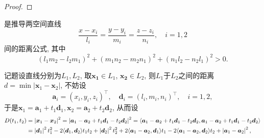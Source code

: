 \begin{quiza}
\begin{proof}
\end{proof}
\woe 是推导两空间直线\[\frac{x-x_i}{l_i}=\frac{y-y_i}{m_i}=\frac{z-z_i}{n_i},\quad i=1,2\]间的距离公式, 其中\[(l_1m_2-l_2m_1)^2+(m_1n_2-m_2n_1)^2+(n_1l_2-n_2l_1)^2>0.\]
\begin{solution}
记题设直线分别为\(L_1,L_2\), 取\(\boldsymbol{x_1}\in L_1\), \(\boldsymbol{x_2}\in L_2\), 则\(L_1\)于\(L_2\)之间的距离\(d = \min\left|\boldsymbol{x}_1-\boldsymbol{x}_2\right|\), 不妨设\[\boldsymbol{a}_i=\left(x_i,y_i,z_i\right)^\top,\quad \boldsymbol{d}_i=\left(l_i,m_i,n_i\right)^\top,\quad i=1,2,\]于是\(\boldsymbol{x}_1=\boldsymbol{a}_1+t_1\boldsymbol{d}_1,\boldsymbol{x}_2=\boldsymbol{a}_2+t_2\boldsymbol{d}_2\), 从而设\[\begin{split}
D(t_1,t_2)&=\left|\boldsymbol{x}_1-\boldsymbol{x}_2\right|^2=\left|\boldsymbol{a}_1-\boldsymbol{a}_2+t_1\boldsymbol{d}_1-t_2\boldsymbol{d}_2\right|^2=\inp{\boldsymbol{a}_1-\boldsymbol{a}_2+t_1\boldsymbol{d}_1-t_2\boldsymbol{d}_2,\boldsymbol{a}_1-\boldsymbol{a}_2+t_1\boldsymbol{d}_1-t_2\boldsymbol{d}_2}\\&=\left|\boldsymbol{d}_1\right|^2t_1^2-2\inp{\boldsymbol{d}_1,\boldsymbol{d}_2}t_1t_2+\left|\boldsymbol{d}_2\right|^2t_2^2+2\inp{\boldsymbol{a}_1-\boldsymbol{a}_2,\boldsymbol{d}_1}t_1-2\inp{\boldsymbol{a}_1-\boldsymbol{a}_2,\boldsymbol{d}_2}t_2+\left|\boldsymbol{a}_1-\boldsymbol{a}_2\right|^2,

\end{split}\]
\end{solution}
\end{quiza}
